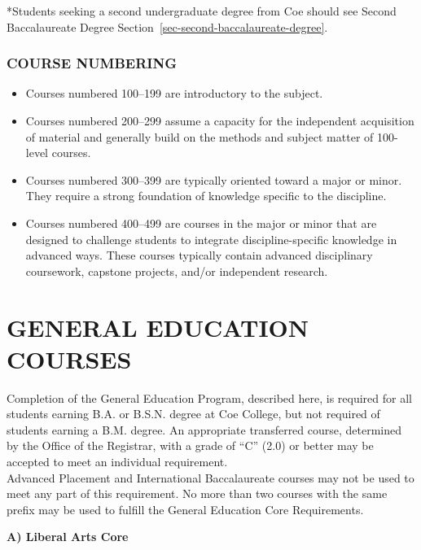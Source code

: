 \documentclass[
  letterpaper,
]{scrbook}
\providecommand{\tightlist}{%
  \setlength{\itemsep}{0pt}\setlength{\parskip}{0pt}}
\begin{document}
*Students seeking a second undergraduate degree from Coe should see
Second Baccalaureate Degree
Section~\ref{sec-second-baccalaureate-degree}.

\subsection{COURSE NUMBERING}\label{course-numbering}

\begin{itemize}
\tightlist
\item
  Courses numbered 100--199 are introductory to the subject.
\item
  Courses numbered 200--299 assume a capacity for the independent
  acquisition of material and generally build on the methods and subject
  matter of 100-level courses.
\item
  Courses numbered 300--399 are typically oriented toward a major or
  minor. They require a strong foundation of knowledge specific to the
  discipline.
\item
  Courses numbered 400--499 are courses in the major or minor that are
  designed to challenge students to integrate discipline-specific
  knowledge in advanced ways. These courses typically contain advanced
  disciplinary coursework, capstone projects, and/or independent
  research.
\end{itemize}

\chapter{GENERAL EDUCATION COURSES}\label{sec-general-education-courses}

Completion of the General Education Program, described here, is required
for all students earning B.A. or B.S.N. degree at Coe College, but not
required of students earning a B.M. degree. An appropriate transferred
course, determined by the Office of the Registrar, with a grade of ``C''
(2.0) or better may be accepted to meet an individual requirement.\\
Advanced Placement and International Baccalaureate courses may not be
used to meet any part of this requirement. No more than two courses with
the same prefix may be used to fulfill the General Education Core
Requirements.

\textbf{A) Liberal Arts Core}
\end{document}
